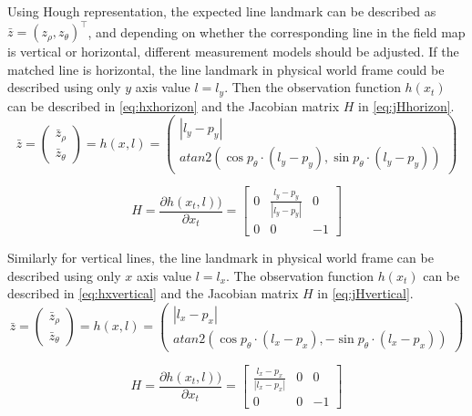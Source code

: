 Using Hough representation, the expected line landmark can be described as $\bar{z} = (z_{\rho}, z_{\theta})^\top$, and depending on whether the corresponding line in the field map is vertical or horizontal, different measurement models should be adjusted. If the matched line is horizontal, the line landmark in physical world frame could be described using only $y$ axis value $l = l_{y}$. Then the observation function $h(x_t)$ can be described in \autoref{eq:hxhorizon} and the Jacobian matrix $H$ in \autoref{eq:jHhorizon}. \\
\begin{equation}\label{eq:hxhorizon}
  \bar{z} = \begin{pmatrix}
\bar{z}_{\rho}\\ 
\bar{z}_{\theta}
\end{pmatrix}
= 
h(x, l)
=
\begin{pmatrix}
|l_{y}-p_{y}| \\
atan2(\cos{p_{\theta}\cdot (l_y-p_y)}, \sin{p_{\theta}}\cdot (l_y-p_y))
\end{pmatrix}
\end{equation}

\begin{equation}\label{eq:jHhorizon}
H =
\frac{\partial h(x_t,l))}{\partial x_t}
=
\begin{bmatrix}
  0 & \frac{l_{y}-p_{y}}{|l_{y}-p_{y}|} & 0 \\ 
  0 & 0 & -1 
\end{bmatrix}
\end{equation}

Similarly for vertical lines, the line landmark in physical world frame can be described using only $x$ axis value $l = l_{x}$. The observation function $h(x_t)$ can be described in \autoref{eq:hxvertical} and the Jacobian matrix $H$ in \autoref{eq:jHvertical}. \\
\begin{equation}\label{eq:hxvertical}
  \bar{z} = \begin{pmatrix}
\bar{z}_{\rho}\\ 
\bar{z}_{\theta}
\end{pmatrix}
= 
h(x, l)
=
\begin{pmatrix}
|l_{x}-p_{x}| \\
atan2(\cos{p_{\theta}\cdot (l_x-p_x)}, -\sin{p_{\theta}}\cdot (l_x-p_x))
\end{pmatrix}
\end{equation}

\begin{equation}\label{eq:jHvertical}
H =
\frac{\partial h(x_t,l))}{\partial x_t}
=
\begin{bmatrix}
  \frac{l_{x}-p_{x}}{|l_{x}-p_{x}|} & 0 & 0\\ 
  0 & 0 & -1 
\end{bmatrix}
\end{equation}

